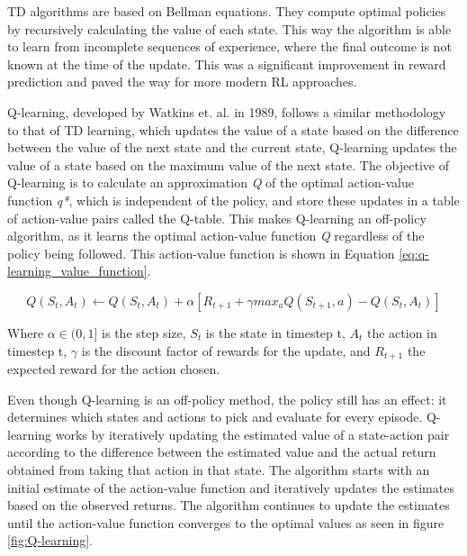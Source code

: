 TD algorithms are based on Bellman equations. They compute optimal policies by recursively calculating the value of each state. This way the algorithm is able to learn from incomplete sequences of experience, where the final outcome is not known at the time of the update. This was a significant improvement in reward prediction and paved the way for more modern RL approaches. 

Q-learning, developed by Watkins et. al. \cite{watkins1992q} in 1989, follows a similar methodology to that of TD learning, which updates the value of a state based on the difference between the value of the next state and the current state, Q-learning updates the value of a state based on the maximum value of the next state. The objective of Q-learning is to calculate an approximation \textit{Q} of the optimal action-value function \textit{q*}, which is independent of the policy, and store these updates in a table of action-value pairs called the Q-table. This makes Q-learning an off-policy algorithm, as it learns the optimal action-value function \textit{Q} regardless of the policy being followed. This action-value function is shown in Equation \ref{eq:q-learning_value_function}.

\begin{equation}
    \label{eq:q-learning_value_function}
    Q(S_t, A_t) \leftarrow Q(S_t, A_t) + \alpha [R_{t+1} + \gamma max_a Q(S_{t+1}, a) - Q(S_t, A_t)]
\end{equation}

Where $\alpha \in (0,1]$ is the step size, $S_t$ is the state in timestep t, $A_t$ the action in timestep t, $\gamma$ is the discount factor of rewards for the update, and $R_{t+1}$ the expected reward for the action chosen.

Even though Q-learning is an off-policy method, the policy still has an effect: it determines which states and actions to pick and evaluate for every episode. Q-learning works by iteratively updating the estimated value of a state-action pair according to the difference between the estimated value and the actual return obtained from taking that action in that state. The algorithm starts with an initial estimate of the action-value function and iteratively updates the estimates based on the observed returns. The algorithm continues to update the estimates until the action-value function converges to the optimal values as seen in figure \ref{fig:Q-learning}.


